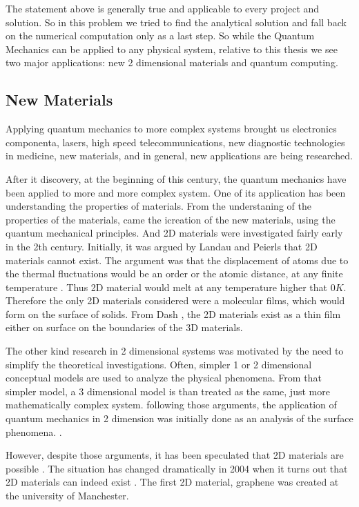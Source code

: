 The statement above is generally true and applicable to every project and solution. So in this problem we tried to find the analytical solution and fall back on the numerical computation only as a last step. So while the Quantum Mechanics can be applied to any physical system, relative to this thesis we see two major applications: new 2 dimensional materials and quantum computing.

\subsection*{New Materials}

Applying quantum mechanics to more complex systems brought us electronics componenta, lasers, high speed telecommunications, new diagnostic technologies in medicine, new materials, and in general, new applications are being researched.

After it discovery, at the beginning of this century, the quantum mechanics have been applied to more and more complex system. One of its application has been understanding the properties of materials.
From the understaning of the properties of the materials, came the icreation of the new materials, using the quantum mechanical principles. And 2D materials were investigated fairly early in the 2th century.
Initially, it was argued by Landau and Peierls \cite{LandauG}\cite{Pierls} that 2D materials cannot exist. The argument was that the displacement of atoms due to the thermal fluctuations would be an order or the atomic distance, at any finite temperature \cite{LandauG, Pierls}. Thus 2D material would melt at any temperature higher that $ 0 K $. Therefore the only 2D materials considered were a molecular films, which would form on the surface of solids. From Dash \cite{2DMatter1}, the 2D materials exist as a thin film either on surface on the boundaries of the 3D materials.

The other kind research in 2 dimensional systems was motivated by the need to simplify the theoretical investigations. Often, simpler 1 or 2 dimensional  conceptual models are used to analyze the physical phenomena. From that simpler model, a 3 dimensional model is than treated as the same, just more mathematically complex system.  following those arguments, the application of  quantum mechanics in 2 dimension was initially done as an analysis of the surface phenomena. \cite{2dfilm}. 

However, despite those arguments, it has been speculated that 2D materials are possible \cite{2DMatter1}. The situation has changed dramatically in 2004 when it turns out that 2D materials can indeed exist \cite{Graphene0}. The first 2D material, graphene was created \cite{GrapheneN} at the university of Manchester.

